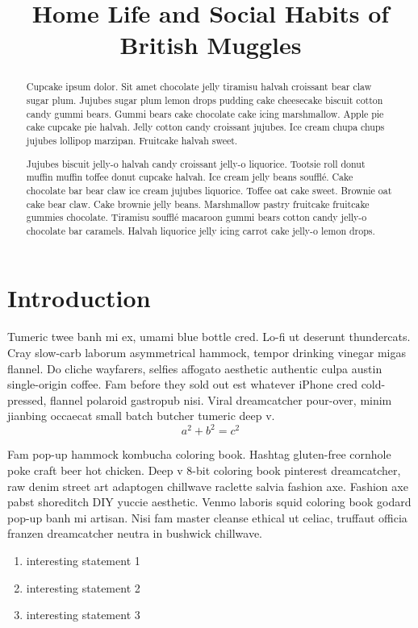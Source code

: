 \documentclass[ma493]{swumath}
\title{Home Life and Social Habits of British Muggles}
\begin{document}
\frontmatter

\maketitle
\makeapprovalpage
\begin{abstract}
	Cupcake ipsum dolor. Sit amet chocolate jelly tiramisu halvah croissant bear claw sugar plum. Jujubes sugar plum lemon drops pudding cake cheesecake biscuit cotton candy gummi bears. Gummi bears cake chocolate cake icing marshmallow. Apple pie cake cupcake pie halvah. Jelly cotton candy croissant jujubes. Ice cream chupa chups jujubes lollipop marzipan. Fruitcake halvah sweet.

Jujubes biscuit jelly-o halvah candy croissant jelly-o liquorice. Tootsie roll donut muffin muffin toffee donut cupcake halvah. Ice cream jelly beans soufflé. Cake chocolate bar bear claw ice cream jujubes liquorice. Toffee oat cake sweet. Brownie oat cake bear claw. Cake brownie jelly beans. Marshmallow pastry fruitcake fruitcake gummies chocolate. Tiramisu soufflé macaroon gummi bears cotton candy jelly-o chocolate bar caramels. Halvah liquorice jelly icing carrot cake jelly-o lemon drops.
\end{abstract}
\tableofcontents

\mainmatter

\chapter{Introduction}
Tumeric twee banh mi ex, umami blue bottle cred. Lo-fi ut deserunt thundercats. Cray slow-carb laborum asymmetrical hammock, tempor drinking vinegar migas flannel. Do cliche wayfarers, selfies affogato aesthetic authentic culpa austin single-origin coffee. Fam before they sold out est whatever iPhone cred cold-pressed, flannel polaroid gastropub nisi. Viral dreamcatcher pour-over, minim jianbing occaecat small batch butcher tumeric deep v.
\begin{equation}
a^2+b^2=c^2
\end{equation}

Fam pop-up hammock kombucha coloring book. Hashtag gluten-free cornhole poke craft beer hot chicken. Deep v 8-bit coloring book pinterest dreamcatcher, raw denim street art adaptogen chillwave raclette salvia fashion axe. Fashion axe pabst shoreditch DIY yuccie aesthetic. Venmo laboris squid coloring book godard pop-up banh mi artisan. Nisi fam master cleanse ethical ut celiac, truffaut officia franzen dreamcatcher neutra in bushwick chillwave.
\begin{enumerate}
\item interesting statement 1
\item interesting statement 2
\item interesting statement 3
\end{enumerate}
\end{document}
